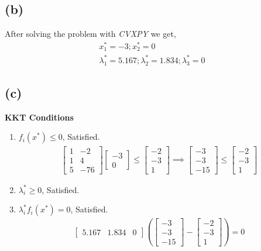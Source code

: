 \documentclass{article}
\begin{document}
\subsection*{(b)}
After solving the problem with \textit{CVXPY} we get,
\begin{gather*}
	x_1^* = -3;
	x_2^* = 0\\
	\lambda _{1}^* = 5.167; \lambda _{2}^* = 1.834;\lambda _{3}^* = 0
\end{gather*}
\subsection*{(c)}
\textbf{KKT Conditions}\\
\begin{enumerate}
	\item $f_i(x^*) \le 0$, Satisfied.\\
	\begin{gather*}
	\begin{bmatrix}
		1 & -2\\
		1 & 4\\
		5 & -76
		\end{bmatrix}\begin{bmatrix}
		-3\\
		0
		\end{bmatrix} \le \begin{bmatrix}
		-2\\
		-3\\
		1
	\end{bmatrix}
	\implies \begin{bmatrix}
		-3\\
		-3\\
		-15
	\end{bmatrix} \le \begin{bmatrix}
		-2\\
		-3\\
		1
	\end{bmatrix}
	\end{gather*}
	\item $\lambda _i^* \ge 0$, Satisfied.
	\item $\lambda _i^*f_i(x^*) = 0$, Satisfied.
	\begin{gather*}
		\begin{bmatrix}
		5.167 & 1.834 & 0
		\end{bmatrix}\left(\begin{bmatrix}
		-3\\
		-3\\
		-15
	\end{bmatrix} - \begin{bmatrix}
		-2\\
		-3\\
		1
	\end{bmatrix}\right) = 0
	\end{gather*}
\end{enumerate}
\end{document}
